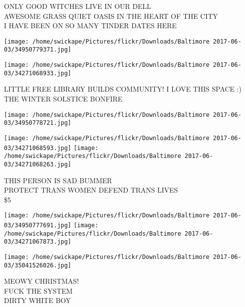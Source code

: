 \documentclass[10pt,letterpaper]{article}
\begin{document}
ONLY GOOD WITCHES LIVE IN OUR DELL\\
AWESOME GRASS QUIET OASIS IN THE HEART OF THE CITY\\
I HAVE BEEN ON SO MANY TINDER DATES HERE\\
\pagebreak

\texttt{[image: /home/swickape/Pictures/flickr/Downloads/Baltimore 2017-06-03/34950779371.jpg]}

\vspace{0.25in}
\texttt{[image: /home/swickape/Pictures/flickr/Downloads/Baltimore 2017-06-03/34271068933.jpg]}

LITTLE FREE LIBRARY BUILDS COMMUNITY!  I LOVE THIS SPACE :)\\
THE WINTER SOLSTICE BONFIRE\\
\pagebreak

\texttt{[image: /home/swickape/Pictures/flickr/Downloads/Baltimore 2017-06-03/34950778721.jpg]}

\vspace{0.25in}
\texttt{[image: /home/swickape/Pictures/flickr/Downloads/Baltimore 2017-06-03/34271068593.jpg]}
\texttt{[image: /home/swickape/Pictures/flickr/Downloads/Baltimore 2017-06-03/34271068263.jpg]}

THIS PERSON IS SAD BUMMER\\
PROTECT TRANS WOMEN DEFEND TRANS LIVES\\
\$5\\
\pagebreak

\texttt{[image: /home/swickape/Pictures/flickr/Downloads/Baltimore 2017-06-03/34950777691.jpg]}
\texttt{[image: /home/swickape/Pictures/flickr/Downloads/Baltimore 2017-06-03/34271067873.jpg]}

\texttt{[image: /home/swickape/Pictures/flickr/Downloads/Baltimore 2017-06-03/35041526026.jpg]}

MEOWY CHRISTMAS!\\
FUCK THE SYSTEM\\
DIRTY WHITE BOY\\
\pagebreak
\end{document}
